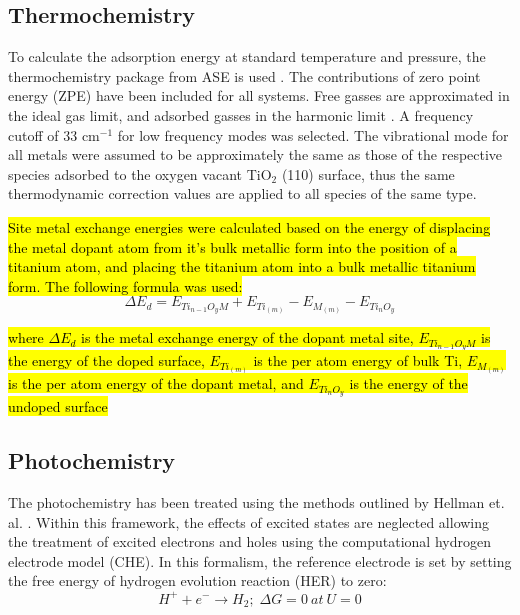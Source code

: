 \subsection{Thermochemistry}

To calculate the adsorption energy at standard temperature and pressure, the thermochemistry package from ASE is used \cite{ase-paper}. The contributions of zero point energy (ZPE) have been included for all systems. Free gasses are approximated in the ideal gas limit, and adsorbed gasses in the harmonic limit \cite{Reuter_2005}. A frequency cutoff of 33 cm$^{-1}$ for low frequency modes was selected. The vibrational mode for all metals were assumed to be approximately the same as those of the respective species adsorbed to the oxygen vacant TiO$_2$ (110) surface, thus the same thermodynamic correction values are applied to all species of the same type.

\hl{Site metal exchange energies were calculated based on the  energy of displacing the metal dopant atom from it's bulk metallic form into the position of a titanium atom, and placing the titanium atom into a bulk metallic titanium form. The following formula was used:}
\begin{equation}
    \Delta E_{d} = E_{Ti_{n-1}O_yM} + E_{Ti_{(m)}} - E_{M_{(m)}} - E_{Ti_{n}O_{y}}
\end{equation}

\hl{where $\Delta E_{d}$ is the metal exchange energy of the dopant metal site, $E_{Ti_{n-1}O_yM}$ is the energy of the doped surface, $E_{Ti_{(m)}}$ is the per atom energy of bulk Ti, $E_{M_{(m)}}$ is the per atom energy of the dopant metal, and $E_{Ti_{n}O_{y}}$ is the energy of the undoped surface}

\subsection{Photochemistry}
\label{sec:PEC_methods}
The photochemistry has been treated using the methods outlined by Hellman et. al. \cite{Hellman2017}. Within this framework, the effects of excited states are neglected allowing the treatment of excited electrons and holes using the computational hydrogen electrode model (CHE). In this formalism, the reference electrode is set by setting the free energy of hydrogen evolution reaction (HER) to zero:
\begin{equation}
    H^+ + e^- \rightarrow H_2;\; \Delta G = 0\:at\: U = 0
\end{equation}

